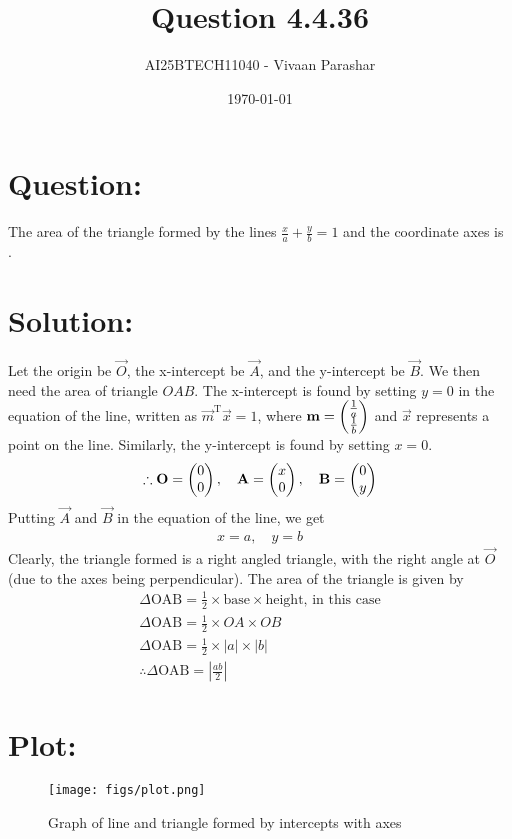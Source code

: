 \documentclass[a4paper, 12pt]{article}
\title{Question 4.4.36}
\author{AI25BTECH11040 - Vivaan Parashar}
\date{\today}
\begin{document}
\maketitle

\section{Question: }
The area of the triangle formed by the lines $\frac{x}{a} + \frac{y}{b} = 1$ and the coordinate axes is \underline{\hspace{2cm}}.

\section{Solution: }
Let the origin be $\vec{O}$, the x-intercept be $\vec{A}$, and the y-intercept be $\vec{B}$. We then need the area of triangle $OAB$.
The x-intercept is found by setting $y=0$ in the equation of the line, written as $\vec{m}^{\mathrm{T}}\vec{x} = 1$, where $\mathbf{m} = \begin{pmatrix}\frac{1}{a} \\ \frac{1}{b}\end{pmatrix}$ and $\vec{x}$ represents a point on the line. Similarly, the y-intercept is found by setting $x=0$.
\begin{align}
    \therefore \mathbf{O} = \begin{pmatrix}0 \\ 0\end{pmatrix}, \quad \mathbf{A} = \begin{pmatrix}x \\ 0\end{pmatrix}, \quad \mathbf{B} = \begin{pmatrix}0 \\ y\end{pmatrix}
\end{align}
Putting $\vec{A}$ and $\vec{B}$ in the equation of the line, we get
\begin{align}
    x = a, \quad y = b
\end{align}
Clearly, the triangle formed is a right angled triangle, with the right angle at $\vec{O}$ (due to the axes being perpendicular). The area of the triangle is given by
\begin{align}
    \Delta\text{OAB} = \frac{1}{2} \times \text{base} \times \text{height},\,\text{in this case}\\
    \Delta\text{OAB} = \frac{1}{2} \times OA \times OB\\
    \Delta\text{OAB} = \frac{1}{2} \times |a| \times |b|\\
    \therefore \Delta\text{OAB} = \left|\frac{ab}{2}\right|
\end{align}

\section{Plot: }
\begin{figure}[h!]
    \centering
    \texttt{[image: figs/plot.png]}
    \caption{Graph of line and triangle formed by intercepts with axes}
    \label{fig:4.4.36}
\end{figure}
\end{document}
